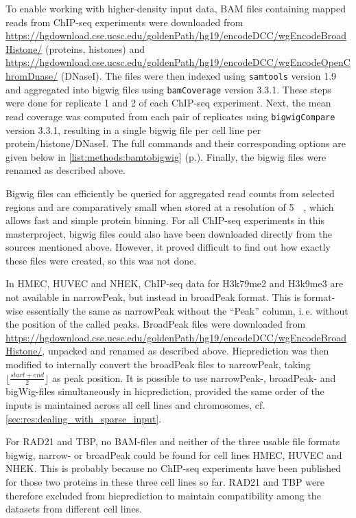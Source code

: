 To enable working with higher-density input data, BAM files containing mapped reads from ChIP-seq experiments were downloaded from 
\url{https://hgdownload.cse.ucsc.edu/goldenPath/hg19/encodeDCC/wgEncodeBroadHistone/} (proteins, histones) and 
\url{https://hgdownload.cse.ucsc.edu/goldenPath/hg19/encodeDCC/wgEncodeOpenChromDnase/} (DNaseI). 
The files were then indexed using \texttt{samtools} version 1.9
and aggregated into bigwig files using \texttt{bamCoverage} version 3.3.1. 
These steps were done for replicate 1 and 2 of each ChIP-seq experiment.
Next, the mean read coverage was computed from each pair of replicates using \texttt{bigwigCompare} version 3.3.1, 
resulting in a single bigwig file per cell line per protein/histone/DNaseI.
The full commands and their corresponding options are given below in \autoref{list:methods:bamtobigwig} (p.\;\pageref{list:methods:bamtobigwig}).
Finally, the bigwig files were renamed as described above.

Bigwig files can efficiently be queried for aggregated read counts from selected regions
and are comparatively small when stored at a resolution of \SI{5}{\kilo\bp}, which allows fast and simple protein binning.
For all ChIP-seq experiments in this masterproject, bigwig files could also have been downloaded directly from the sources mentioned above.
However, it proved difficult to find out how exactly these files were created, so this was not done.

In HMEC, HUVEC and NHEK, ChIP-seq data for H3k79me2 and H3k9me3 are not available in narrowPeak,
but instead in broadPeak format. This is format-wise essentially the same as narrowPeak
without the ``Peak'' column, i.\,e. without the position of the called peaks. 
BroadPeak files were downloaded from 
\url{https://hgdownload.cse.ucsc.edu/goldenPath/hg19/encodeDCC/wgEncodeBroadHistone/}, 
unpacked and renamed as described above. 
Hicprediction was then modified to internally convert the broadPeak files to 
narrowPeak, taking $\lfloor\frac{start + end}{2}\rfloor$ as peak position. 
It is possible to use narrowPeak-, broadPeak- and bigWig-files simultaneously in hicprediction, 
provided the same order of the inputs is maintained across all cell lines and chromosomes, cf.\;\autoref{sec:res:dealing_with_sparse_input}.

For RAD21 and TBP, no BAM-files and neither of the three usable file formats bigwig, narrow- or broadPeak 
could be found for cell lines HMEC, HUVEC and NHEK.
This is probably because no ChIP-seq experiments have been published for those two proteins in these three cell lines so far.
RAD21 and TBP were therefore excluded from hicprediction to maintain compatibility among the datasets from different cell lines.

